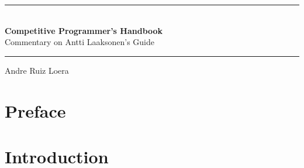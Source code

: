 \documentclass[12pt,letterpaper]{book}
\theoremstyle{definition}
\theoremstyle{remark}
\begin{document}
\begin{titlepage}
\begin{center}

\vspace*{4cm}

\rule{\textwidth}{1.5pt}\\[0.5cm]

{\Huge\bfseries Competitive Programmer's Handbook}\\[0.5cm]

{\Large Commentary on Antti Laaksonen's Guide}

\rule{\textwidth}{1.5pt}

\vfill

{\LARGE Andre Ruiz Loera}

\vspace{3cm}

\end{center}
\end{titlepage}

\chapter*{Preface}


\clearpage

\tableofcontents
\clearpage

\chapter{Introduction}
\end{document}
